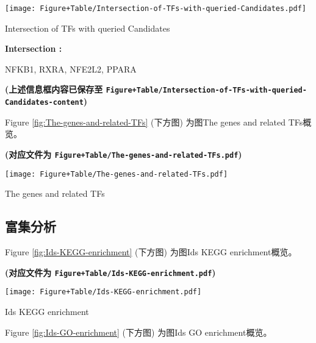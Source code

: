 \documentclass[
]{article}
\begin{document}
\def\@captype{figure}
\begin{center}
\texttt{[image: Figure+Table/Intersection-of-TFs-with-queried-Candidates.pdf]}
\caption{Intersection of TFs with queried Candidates}\label{fig:Intersection-of-TFs-with-queried-Candidates}
\end{center}
\begin{center}\begin{tcolorbox}[colback=gray!10, colframe=gray!50, width=0.9\linewidth, arc=1mm, boxrule=0.5pt]
\textbf{
Intersection
:}

\vspace{0.5em}

    NFKB1, RXRA, NFE2L2, PPARA

\vspace{2em}
\end{tcolorbox}
\end{center}

\textbf{(上述信息框内容已保存至 \texttt{Figure+Table/Intersection-of-TFs-with-queried-Candidates-content})}

Figure \ref{fig:The-genes-and-related-TFs} (下方图) 为图The genes and related TFs概览。

\textbf{(对应文件为 \texttt{Figure+Table/The-genes-and-related-TFs.pdf})}

\def\@captype{figure}
\begin{center}
\texttt{[image: Figure+Table/The-genes-and-related-TFs.pdf]}
\caption{The genes and related TFs}\label{fig:The-genes-and-related-TFs}
\end{center}

\hypertarget{enrich}{%
\subsection{富集分析}\label{enrich}}

Figure \ref{fig:Ids-KEGG-enrichment} (下方图) 为图Ids KEGG enrichment概览。

\textbf{(对应文件为 \texttt{Figure+Table/Ids-KEGG-enrichment.pdf})}

\def\@captype{figure}
\begin{center}
\texttt{[image: Figure+Table/Ids-KEGG-enrichment.pdf]}
\caption{Ids KEGG enrichment}\label{fig:Ids-KEGG-enrichment}
\end{center}

Figure \ref{fig:Ids-GO-enrichment} (下方图) 为图Ids GO enrichment概览。
\end{document}
